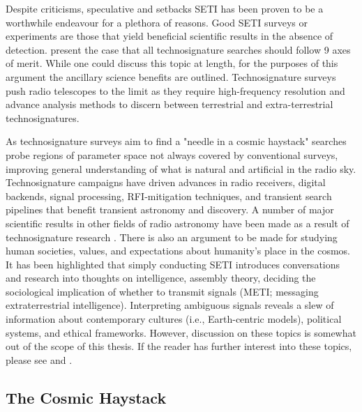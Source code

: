 Despite criticisms, speculative and setbacks SETI has been proven to be a worthwhile endeavour for a plethora of reasons. Good SETI surveys or experiments are those that yield beneficial scientific results in the absence of detection. \cite{sheikh_nine_2020} present the case that all technosignature searches should follow 9 axes of merit. While one could discuss this topic at length, for the purposes of this argument the ancillary science benefits are outlined. Technosignature surveys push radio telescopes to the limit as they require high-frequency resolution and advance analysis methods to discern between terrestrial and extra-terrestrial technosignatures. 

As technosignature surveys aim to find a "needle in a cosmic haystack" searches probe regions of parameter space not always covered by conventional surveys, improving general understanding of what is natural and artificial in the radio sky. Technosignature campaigns have driven advances in radio receivers, digital backends, signal processing, RFI‑mitigation techniques, and transient search pipelines that benefit transient astronomy and discovery. A number of major scientific results in other fields of radio astronomy have been made as a result of technosignature research \citep[i.e.][]{gaj18apj, snelders_detection_2023,foster_extraterrestrial_2022,jacobson-bell_anomaly_2025,perez_deepest_2026}. There is also an argument to be made for studying human societies, values, and expectations about humanity's place in the cosmos. It has been highlighted that simply conducting SETI introduces conversations and research into thoughts on intelligence, assembly theory, deciding the sociological implication of whether to transmit signals (METI; messaging extraterrestrial intelligence). Interpreting ambiguous signals reveals a slew of information about contemporary cultures (i.e., Earth-centric models), political systems, and ethical frameworks. However, discussion on these topics is somewhat out of the scope of this thesis. If the reader has further interest into these topics, please see \cite{denning_impossible_2013} and \cite{vidal_beginning_2014}.

\subsection{The Cosmic Haystack}

